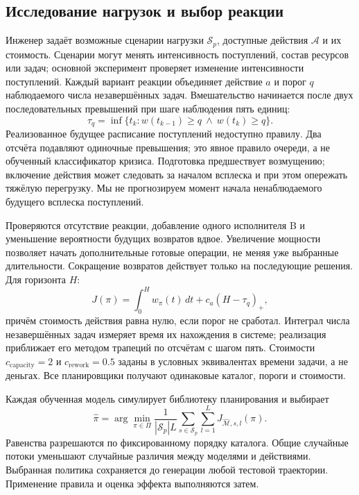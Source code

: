 \documentclass[runningheads]{llncs}
\begin{document}
\subsection{Исследование нагрузок и выбор реакции}
Инженер задаёт возможные сценарии нагрузки $\mathcal S_p$, доступные действия $\mathcal A$ и их стоимость. Сценарии могут менять интенсивность поступлений, состав ресурсов или задач; основной эксперимент проверяет изменение интенсивности поступлений. Каждый вариант реакции объединяет действие $a$ и порог $q$ наблюдаемого числа незавершённых задач. Вмешательство начинается после двух последовательных превышений при шаге наблюдения пять единиц:
\begin{equation}\label{eq:trigger}
\tau_q=\inf\{t_k:w(t_{k-1})\geq q\ \land\ w(t_k)\geq q\}.
\end{equation}
Реализованное будущее расписание поступлений недоступно правилу. Два отсчёта подавляют одиночные превышения; это явное правило очереди, а не обученный классификатор кризиса. Подготовка предшествует возмущению; включение действия может следовать за началом всплеска и при этом опережать тяжёлую перегрузку. Мы не прогнозируем момент начала ненаблюдаемого будущего всплеска поступлений.

Проверяются отсутствие реакции, добавление одного исполнителя B и уменьшение вероятности будущих возвратов вдвое. Увеличение мощности позволяет начать дополнительные готовые операции, не меняя уже выбранные длительности. Сокращение возвратов действует только на последующие решения. Для горизонта $H$:
\begin{equation}\label{eq:cost}
J(\pi)=\int_0^H w_\pi(t)\,dt+c_a(H-\tau_q)_+,
\end{equation}
причём стоимость действия равна нулю, если порог не сработал. Интеграл числа незавершённых задач измеряет время их нахождения в системе; реализация приближает его методом трапеций по отсчётам с шагом пять. Стоимости $c_{\mathrm{capacity}}=2$ и $c_{\mathrm{rework}}=0.5$ заданы в условных эквивалентах времени задачи, а не деньгах. Все планировщики получают одинаковые каталог, пороги и стоимости.

Каждая обученная модель симулирует библиотеку планирования и выбирает
\begin{equation}\label{eq:policy}
\widehat\pi=\arg\min_{\pi\in\Pi}\frac{1}{|\mathcal S_p|L}
\sum_{s\in\mathcal S_p}\sum_{l=1}^{L}J_{\widehat{\mathcal M},s,l}(\pi).
\end{equation}
Равенства разрешаются по фиксированному порядку каталога. Общие случайные потоки уменьшают случайные различия между моделями и действиями. Выбранная политика сохраняется до генерации любой тестовой траектории. Применение правила и оценка эффекта выполняются затем.
\end{document}
